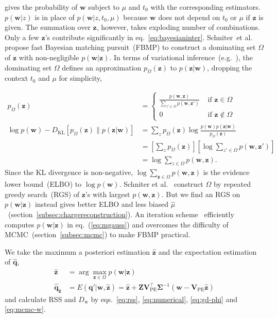 gives the probability of $\bm{w}$ subject to $\mu$ and $t_0$ with the corresponding estimators. $p(\bm{w}|z)$ is in place of $p(\bm{w}|z, t_0, \mu)$ because $\bm{w}$ does not depend on $t_0$ or $\mu$ if $\bm{z}$ is given.  The summation over $\bm{z}$, however, takes exploding number of combinations. Only a few $\bm{z}$'s contribute significantly in eq.~\eqref{eq:bayesianinter}.  Schniter~et al.~\cite{schniter_fast_2008} propose fast Bayesian matching pursuit~(FBMP) to construct a dominating set $\Omega$ of $\bm{z}$ with non-negligible $p(\bm{w}|\bm{z})$.  In terms of variational inference~(e.g.~\cite{mackay_information_2003}), the dominating set $\Omega$ defines an approximation $p_\Omega(\bm{z})$ to $p(\bm{z}|\bm{w})$, dropping the context $t_0$ and $\mu$ for simplicity,

\begin{equation}
  \label{eq:VI}
  \begin{aligned}
    p_\Omega(\bm{z}) &= \begin{cases}
      \frac{p(\bm{w},\bm{z})}{\sum_{z' \in \Omega} p(\bm{w},\bm{z}')} & \text{ if } \bm{z} \in \Omega \\ 
      0 & \text{ if } \bm{z} \notin \Omega
    \end{cases}\\
    \log p(\bm{w}) - D_\mathrm{KL}\left[p_\Omega(\bm{z}) \parallel p(\bm{z}|\bm{w})\right] &= \sum_z p_\Omega(\bm{z}) \log \frac{p(\bm{w}) p(\bm{z}|\bm{w})}{p_\Omega(\bm{z})} \\
    &= \left[\sum_z p_\Omega(\bm{z})\right]\left[\log \sum_{z' \in \Omega} p(\bm{w}, \bm{z'}) \right] \\
    &= \log \sum_{z \in \Omega} p(\bm{w}, \bm{z}).
  \end{aligned}
\end{equation}
Since the KL divergence is non-negative, $\log \sum_{\bm{z} \in \Omega} p(\bm{w}, \bm{z})$ is the evidence lower bound~(ELBO) to $\log p(\bm{w})$.  Schniter et al.~\cite{schniter_fast_2008} construct $\Omega$ by repeated greedy search~(RGS) of $\bm{z}$'s with largest $p(\bm{w}, \bm{z})$.  But we find an RGS on $p(\bm{w}|\bm{z})$ instead gives better ELBO and less biased $\hat{\mu}$~(section~\ref{subsec:chargereconstruction}).  An iteration scheme~\cite{schniter_fast_2008} efficiently computes $p(\bm{w}|\bm{z})$ in eq.~(\ref{eq:mgauss}) and overcomes the difficulty of MCMC~(section~\ref{subsec:mcmc}) to make FBMP practical.

We take the maximum a posteriori estimation $\hat{\bm{z}}$ and the expectation estimation of $\hat{\bm{q}}$,
\begin{equation}
  \label{eq:fbmpcharge}
  \begin{aligned}
    \hat{\bm{z}} &= \arg \underset{\bm{z} \in \Omega}{\max} p(\bm{w}|\bm{z}) \\
    \hat{\bm{q}}_{\hat{\bm{z}}} &= E(\bm{q}'|\bm{w},\hat{\bm{z}}) = \hat{\bm{z}} + \bm{Z}\bm{V}_\mathrm{PE}^\intercal\bm{\Sigma}^{-1}(\bm{w}-\bm{V}_\mathrm{PE}\hat{\bm{z}})
  \end{aligned}
\end{equation}
and calculate RSS and $D_\mathrm{w}$ by eqs.~\eqref{eq:rss}, \eqref{eq:numerical}, \eqref{eq:gd-phi} and \eqref{eq:mcmc-w}.

